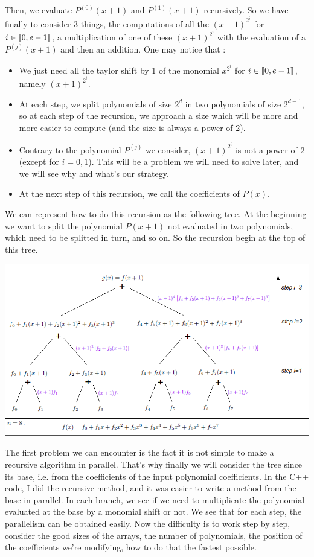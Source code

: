 Then, we evaluate $P^{(0)}(x+1)$ and $P^{(1)}(x+1)$ recursively. So we have finally to consider 3 things, the computations of all the $(x+1)^{2^i}$ for $i\in \mbox{\textlbrackdbl} 0, e-1\mbox{\textrbrackdbl}$, a multiplication of one of these $(x+1)^{2^i}$ with the evaluation of a $P^{(j)}(x+1)$ and then an addition. One may notice that :\\
\begin{itemize}
\item[\textbullet] We just need all the taylor shift by 1 of the monomial $x^{2^i}$ for $i\in \mbox{\textlbrackdbl} 0, e-1\mbox{\textrbrackdbl}$, namely $(x+1)^{2^i}$.
\item[\textbullet] At each step, we split polynomials of size $2^d$ in two polynomials of size $2^{d-1}$, so at each step of the recursion, we approach a size which will be more and more easier to compute (and the size is always a power of 2).
\item[\textbullet] Contrary to the polynomial $P^{(j)}$ we consider, $(x+1)^{2^i}$ is not a power of $2$ (except for $i=0,1$). This will be a problem we will need to solve later, and we will see why and what's our strategy.
\item[\textbullet] At the next step of this recursion, we call the coefficients of $P(x)$.\\
\end{itemize}

We can represent how to do this recursion as the following tree. At the beginning we want to split the polynomial $P(x+1)$ not evaluated in two polynomials, which need to be splitted in turn, and so on. So the recursion begin at the top of this tree.

\begin{center}
\includegraphics[scale=0.8]{ComputingTree.png}
\end{center}

The first problem we can encounter is the fact it is not simple to make a recursive algorithm in parallel. That's why finally we will consider the tree since its base, i.e. from the coefficients of the input polynomial coefficients. In the C++ code, I did the recursive method, and it was easier to write a method from the base in parallel. In each branch, we see if we need to multiplicate the polynomial evaluated at the base by a monomial shift or not. We see that for each step, the parallelism can be obtained easily. Now the difficulty is to work step by step, consider the good sizes of the arrays, the number of polynomials, the position of the coefficients we're modifying, how to do that the fastest possible.
